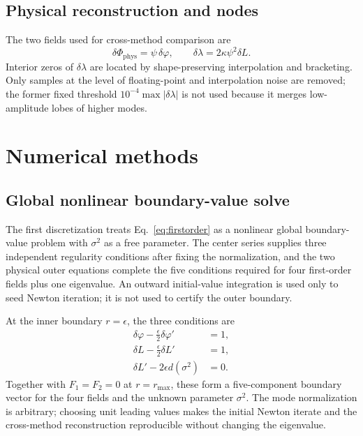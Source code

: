 \documentclass[aps,prd,preprint,onecolumn,nofootinbib,superscriptaddress,showkeys]{revtex4-2}
\newcommand{\sigmatwo}{\sigma^{2}}
\newcommand{\rmax}{r_{\mathrm{max}}}
\begin{document}
\subsection{Physical reconstruction and nodes}

The two fields used for cross-method comparison are
\begin{equation}
\delta\Phi_{\mathrm{phys}}=\psi\,\delta\varphi,
\qquad
\delta\lambda=2\kappa\psi^{2}\delta L.
\end{equation}
Interior zeros of $\delta\lambda$ are located by shape-preserving interpolation and bracketing. Only samples at the level of floating-point and interpolation noise are removed; the former fixed threshold $10^{-4}\max|\delta\lambda|$ is not used because it merges low-amplitude lobes of higher modes.

\section{Numerical methods}\label{sec:methods}

\subsection{Global nonlinear boundary-value solve}

The first discretization treats Eq.~\eqref{eq:firstorder} as a nonlinear global boundary-value problem with $\sigmatwo$ as a free parameter. The center series supplies three independent regularity conditions after fixing the normalization, and the two physical outer equations complete the five conditions required for four first-order fields plus one eigenvalue. An outward initial-value integration is used only to seed Newton iteration; it is not used to certify the outer boundary.

At the inner boundary $r=\epsilon$, the three conditions are
\begin{align}
\delta\varphi-\frac{\epsilon}{2}\delta\varphi'&=1,\\
\delta L-\frac{\epsilon}{2}\delta L'&=1,\\
\delta L'-2\epsilon d(\sigmatwo)&=0.
\end{align}
Together with $F_{1}=F_{2}=0$ at $r=\rmax$, these form a five-component boundary vector for the four fields and the unknown parameter $\sigmatwo$. The mode normalization is arbitrary; choosing unit leading values makes the initial Newton iterate and the cross-method reconstruction reproducible without changing the eigenvalue.
\end{document}
